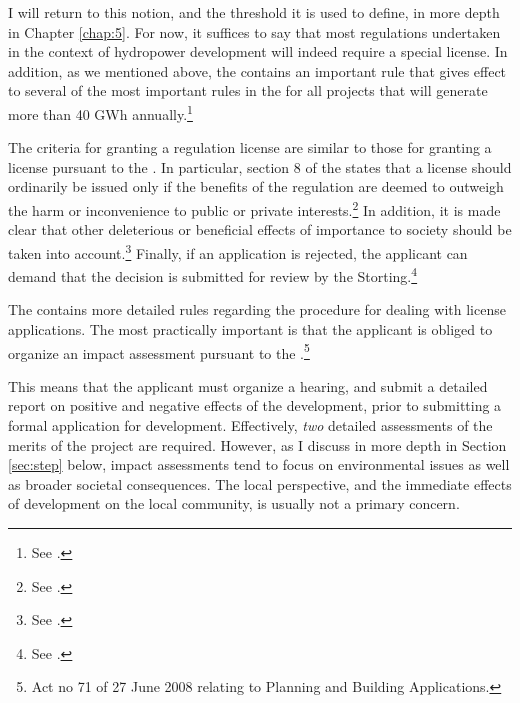 I will return to this notion, and the threshold it is used to define, in more depth in Chapter \ref{chap:5}. For now, it suffices to say that most regulations undertaken in the context of hydropower development will indeed require a special license. In addition, as we mentioned above, the \cite{wra00} contains an important rule that gives effect to several of the most important rules in the \cite{wra17} for all projects that will generate more than 40 GWh annually.\footnote{See \cite[19]{wra00}.}

The criteria for granting a regulation license are similar to those for granting a license pursuant to the \cite{wra00}. In particular, section 8 of the \cite{wra17} states that a license should ordinarily be issued only if the benefits of the regulation are deemed to outweigh the harm or inconvenience to public or private interests.\footnote{See \cite[8]{wra17}.} In addition, it is made clear that other deleterious or beneficial effects of importance to society should be taken into account.\footnote{See \cite[8]{wra17}.} Finally, if an application is rejected, the applicant can demand that the decision is submitted for review by the Storting.\footnote{See \cite[8]{wra17}.}

The \cite{wra17} contains more detailed rules regarding the procedure for dealing with license applications. The most practically important is that the applicant is obliged to organize an impact assessment pursuant to the \cite{pb08}.\footnote{Act no 71 of 27 June 2008 relating to  Planning and Building Applications.}

This means that the applicant must organize a hearing, and submit a detailed report on positive and negative effects of the development, prior to submitting a formal application for development. Effectively, {\it two} detailed assessments of the merits of the project are required. However, as I discuss in more depth in Section \ref{sec:step} below, impact assessments tend to focus on environmental  issues as well as broader societal consequences. The local perspective, and the immediate effects of development on the local community, is usually not a primary concern.

